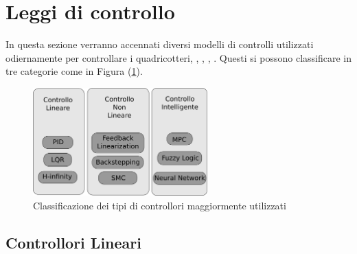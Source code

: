 \section{Leggi di controllo}
In questa sezione verranno accennati diversi modelli di controlli utilizzati odiernamente per controllare i quadricotteri, \cite{ZuluAndrew2014ARoC}, \cite{KimJinho2020ACSo}, \cite{PID_vs_LQ}, \cite{G_inf}. Questi si possono classificare in tre categorie come in Figura (\ref{fig:categoriecontrolli}).
\begin{figure}
	\centering
	\includegraphics[width=0.6\textwidth]{SistemaQuadrirotore/Figure/Classificazione}
	\caption{Classificazione dei tipi di controllori maggiormente utilizzati \cite{KimJinho2020ACSo}}
	\label{fig:categoriecontrolli}
\end{figure}


\subsection{Controllori Lineari}

